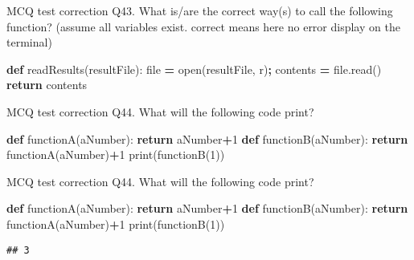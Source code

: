 \documentclass[
  8pt,
  ignorenonframetext,
]{beamer}
\newenvironment{Shaded}{\begin{snugshade}}{\end{snugshade}}
\newcommand{\BuiltInTok}[1]{#1}
\newcommand{\ControlFlowTok}[1]{\textcolor[rgb]{0.13,0.29,0.53}{\textbf{#1}}}
\newcommand{\DecValTok}[1]{\textcolor[rgb]{0.00,0.00,0.81}{#1}}
\newcommand{\KeywordTok}[1]{\textcolor[rgb]{0.13,0.29,0.53}{\textbf{#1}}}
\newcommand{\NormalTok}[1]{#1}
\newcommand{\OperatorTok}[1]{\textcolor[rgb]{0.81,0.36,0.00}{\textbf{#1}}}
\newcommand{\StringTok}[1]{\textcolor[rgb]{0.31,0.60,0.02}{#1}}
\begin{document}
\begin{frame}[fragile]{MCQ test correction}
\protect\hypertarget{mcq-test-correction-85}{}
Q43. What is/are the correct way(s) to call the following function?
(assume all variables exist. correct means here no error display on the
terminal)

\begin{Shaded}
\begin{Highlighting}[]
\KeywordTok{def}\NormalTok{ readResults(resultFile):}
    \BuiltInTok{file} \OperatorTok{=} \BuiltInTok{open}\NormalTok{(resultFile, }\StringTok{\textquotesingle{}r\textquotesingle{}}\NormalTok{)}\OperatorTok{;}
\NormalTok{    contents }\OperatorTok{=} \BuiltInTok{file}\NormalTok{.read()}
    \ControlFlowTok{return}\NormalTok{ contents}
\end{Highlighting}
\end{Shaded}
\end{frame}

\begin{frame}[fragile]{MCQ test correction}
\protect\hypertarget{mcq-test-correction-86}{}
Q44. What will the following code print?

\begin{Shaded}
\begin{Highlighting}[]
\KeywordTok{def}\NormalTok{ functionA(aNumber):}
    \ControlFlowTok{return}\NormalTok{ aNumber}\OperatorTok{+}\DecValTok{1}
\KeywordTok{def}\NormalTok{ functionB(aNumber):}
    \ControlFlowTok{return}\NormalTok{ functionA(aNumber)}\OperatorTok{+}\DecValTok{1}
\BuiltInTok{print}\NormalTok{(functionB(}\DecValTok{1}\NormalTok{))}
\end{Highlighting}
\end{Shaded}
\end{frame}

\begin{frame}[fragile]{MCQ test correction}
\protect\hypertarget{mcq-test-correction-87}{}
Q44. What will the following code print?

\begin{Shaded}
\begin{Highlighting}[]
\KeywordTok{def}\NormalTok{ functionA(aNumber):}
    \ControlFlowTok{return}\NormalTok{ aNumber}\OperatorTok{+}\DecValTok{1}
\KeywordTok{def}\NormalTok{ functionB(aNumber):}
    \ControlFlowTok{return}\NormalTok{ functionA(aNumber)}\OperatorTok{+}\DecValTok{1}
\BuiltInTok{print}\NormalTok{(functionB(}\DecValTok{1}\NormalTok{))}
\end{Highlighting}
\end{Shaded}

\begin{verbatim}
## 3
\end{verbatim}
\end{frame}
\end{document}
